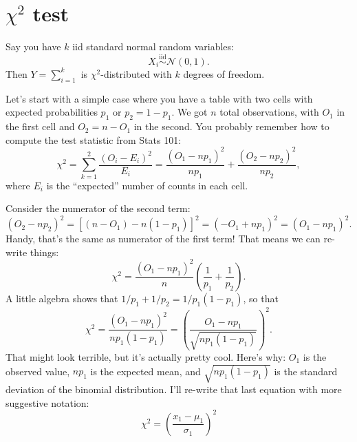 \documentclass{book}
\begin{document}
\section{$\chi^2$ test}

Say you have $k$ iid standard normal random variables:
\begin{equation}
X_i \stackrel{\text{iid}}{\sim} \mathcal{N}(0, 1).
\end{equation}
Then $Y = \sum_{i=1}^k$ is $\chi^2$-distributed with $k$ degrees of freedom.

Let's start with a simple case where you have a table with two cells with
expected probabilities $p_1$ or $p_2 = 1-p_1$. We got $n$ total observations,
with $O_1$ in the first cell and $O_2 = n - O_1$ in the second. You probably
remember how to compute the test statistic from Stats 101:
\begin{equation}
\chi^2 = \sum_{k=1}^2 \frac{(O_i - E_i)^2}{E_i} = \frac{(O_1 - np_1)^2}{np_1} + \frac{(O_2 - np_2)^2}{np_2},
\end{equation}
where $E_i$ is the ``expected'' number of counts in each cell.

Consider the numerator of the second term:
\begin{equation*}
(O_2 - np_2)^2 = \left[(n - O_1) - n(1 - p_1)\right]^2 = (-O_1 + np_1)^2 = (O_1 - np_1)^2.
\end{equation*}
Handy, that's the same as numerator of the first term! That means we can re-write things:
\begin{equation*}
\chi^2 = \frac{(O_1 - np_1)^2}{n}\left( \frac{1}{p_1} + \frac{1}{p_2}\right).
\end{equation*}
A little algebra shows that $1/p_1 + 1/p_2 = 1/p_1(1-p_1)$, so that
\begin{equation}
\chi^2 = \frac{(O_1 - np_1)^2}{np_1(1-p_1)} = \left( \frac{O_1-np_1}{\sqrt{np_1(1-p_1)}} \right)^2.
\end{equation}
That might look terrible, but it's actually pretty cool. Here's why: $O_1$ is the observed value, $np_1$ is the expected mean, and $\sqrt{np_1(1-p_1)}$ is the standard deviation of the binomial distribution. I'll re-write that last equation with more suggestive notation:
\begin{equation}
\chi^2 = \left( \frac{x_1 - \mu_1}{\sigma_1} \right)^2
\end{equation}
\end{document}
